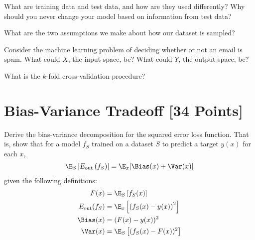 \begin{problem}[2]
  What are training data and test data, and how are they used differently? Why should you never change your model based on information from test data?
\end{problem}
\begin{solution}
  
\end{solution}

\begin{problem}[2]
  What are the two assumptions we make about how our dataset is sampled?
\end{problem}
\begin{solution}
  
\end{solution}

\begin{problem}[2]
  Consider the machine learning problem of deciding whether or not an email is spam. What could $X$, the input space, be? What could $Y$, the output space, be?
\end{problem}
\begin{solution}
  
\end{solution}

\begin{problem}[2]
  What is the $k$-fold cross-validation procedure?
\end{problem}
\begin{solution}
  
\end{solution}




\newpage
\section{Bias-Variance Tradeoff [34 Points]}

\begin{problem}[5]
  Derive the bias-variance decomposition for the squared error loss function. That is, show that for a model $f_S$ trained on a dataset $S$ to predict a target $y(x)$ for each $x$,
  \begin{align*}
    \E_S \left[E_\text{out}\left(f_S\right)\right] = \E_x[\Bias(x) + \Var(x)]
  \end{align*}
  given the following definitions:
  \begin{align*}
    F(x) &= \E_S\left[f_S(x) \right] \\
    E_\text{out}(f_S) &= \E_x\left[\left(f_S(x) - y(x)\right)^2\right] \\
    \Bias(x) &= (F(x) - y(x))^2 \\
    \Var(x) &= \E_S\left[(f_S(x)-F(x))^2\right]
  \end{align*}
\end{problem}

